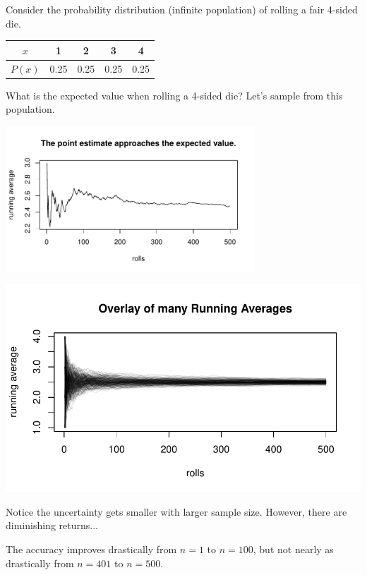 \begin{frame}
Consider the probability distribution (infinite population) of rolling a fair 4-sided die.
\begin{center}
\begin{tabular}{|c | c c c c|} \hline
$x$    & 1    &  2   & 3    & 4\\\hline
$P(x)$ & 0.25 & 0.25 & 0.25 & 0.25 \\ \hline
\end{tabular}
\end{center}
What is the expected value when rolling a 4-sided die? \pause
{}
\vspace{12pt}
Let's sample from this population.
\pause
\vspace{-15pt}
\begin{center}
\includegraphics[width=0.7\textwidth]{4-1_var_in_est/figures/running_mean_4sided_die/running_die.pdf}
\end{center}
\vfill
\end{frame}


\begin{frame}
\vspace{-10pt}
\begin{center}
\includegraphics[width=\textwidth]{4-1_var_in_est/figures/running_mean_4sided_die/running_die_overlay.pdf}
\end{center}
\vspace{-20pt}
Notice the uncertainty gets smaller with larger sample size. However, there are diminishing returns...

The accuracy improves drastically from $n=1$ to $n=100$, but not nearly as drastically from $n=401$ to $n=500$.
\end{frame}



